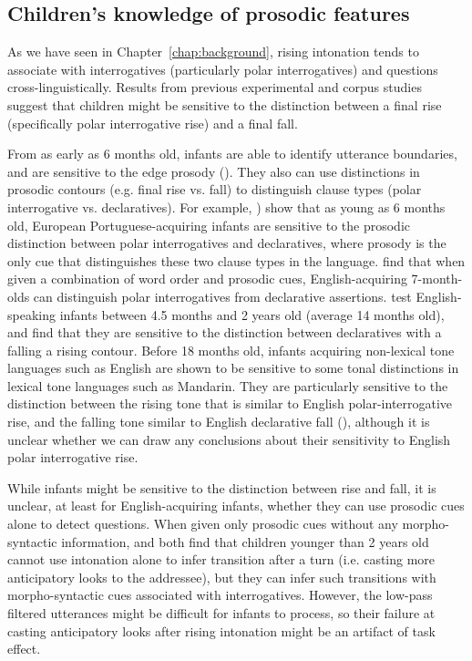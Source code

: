 


\subsection{Children's knowledge of prosodic features}
\label{sec:prosody:children}
As we have seen in Chapter~\ref{chap:background}, rising intonation tends to associate with interrogatives (particularly polar interrogatives) and questions cross-linguistically. Results from previous experimental and corpus studies suggest that children might be sensitive to the distinction between a final rise (specifically polar interrogative rise) and a final fall. 

From as early as 6 months old, infants are able to identify utterance boundaries, and are sensitive to the edge prosody (\cite{johnson2014edge}). They also can use distinctions in prosodic contours (e.g. final rise vs. fall) to distinguish clause types (polar interrogative vs. declaratives). For example, \textcite{frota2014}) show that as young as 6 months old, European Portuguese-acquiring infants are sensitive to the prosodic distinction between polar interrogatives and declaratives, where prosody is the only cue that distinguishes these two clause types in the language. \textcite{geffenmintz2011} find that when given a combination of word order and prosodic cues, English-acquiring 7-month-olds can distinguish polar interrogatives from declarative assertions. \textcite{soderstrom2005clause} test English-speaking infants between 4.5 months and 2 years old (average 14 months old), and find that they are sensitive to the distinction between declaratives with a falling a rising contour. Before 18 months old, infants acquiring non-lexical tone languages such as English are shown to be sensitive to some tonal distinctions in lexical tone languages such as Mandarin. They are particularly sensitive to the distinction between the rising tone that is similar to English polar-interrogative rise, and the falling tone similar to English declarative fall (\cite{shi2017tone, Hay2019}), although it is unclear whether we can draw any conclusions about their sensitivity to English polar interrogative rise.

While infants might be sensitive to the distinction between rise and fall, it is unclear, at least for English-acquiring infants, whether they can use prosodic cues alone to detect questions. When given only prosodic cues without any morpho-syntactic information, \textcite{keitel2013turn} and \textcite{casillas2017turn} both find that children younger than 2 years old cannot use intonation alone to infer transition after a turn (i.e. casting more anticipatory looks to the addressee), but they can infer such transitions with morpho-syntactic cues associated with interrogatives. However, the low-pass filtered utterances might be difficult for infants to process, so their failure at casting anticipatory looks after rising intonation might be an artifact of task effect.

